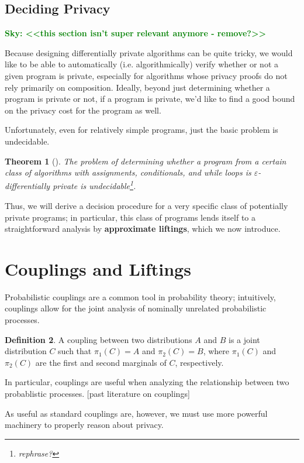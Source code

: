 \documentclass[12pt]{article}
\newcommand{\todo}[2]{\textcolor{#1}{\textbf{#2}}}
\newcommand{\sky}[1]{\todo{green}{Sky: <<#1>>}}
\newtheorem{thm}{Theorem}[section]
\theoremstyle{definition}
\newtheorem{defn}[thm]{Definition}
\begin{document}
\subsection{Deciding Privacy}

\sky{this section isn't super relevant anymore - remove?}

Because designing differentially private algorithms can be quite tricky, we would like to be able to automatically (i.e. algorithmically) verify whether or not a given program is private, especially for algorithms whose privacy proofs do not rely primarily on composition. 
Ideally, beyond just determining whether a program is private or not, if a program is private, we'd like to find a good bound on the privacy cost for the program as well. 

Unfortunately, even for relatively simple programs, just the basic problem is undecidable. 

\begin{thm}[\cite{barthe.etal2020decidingdp}]
    The problem of determining whether a program from a certain class of algorithms with assignments, conditionals, and while loops is $\varepsilon$-differentially private is undecidable\footnote{rephrase?}.
\end{thm}

Thus, we will derive a decision procedure for a very specific class of potentially private programs; in particular, this class of programs lends itself to a straightforward analysis by \textbf{approximate liftings}, which we now introduce. 

\section{Couplings and Liftings}

Probabilistic couplings are a common tool in probability theory; intuitively, couplings allow for the joint analysis of nominally unrelated probabilistic processes. 

\begin{defn}
    A coupling between two distributions $A$ and $B$ is a joint distribution $C$ such that $\pi_1(C)=A$ and $\pi_2(C)=B$, where $\pi_1(C)$ and $\pi_2(C)$ are the first and second marginals of $C$, respectively. 
\end{defn}

In particular, couplings are useful when analyzing the relationship between two probablistic processes. [past literature on couplings]

As useful as standard couplings are, however, we must use more powerful machinery to properly reason about privacy.
\end{document}
